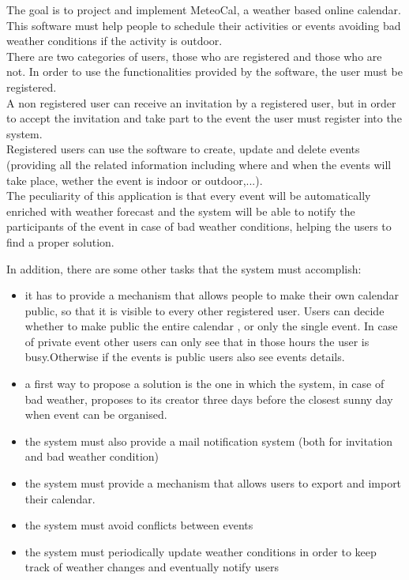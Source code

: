 \documentclass[12pt]{book}
\begin{document}
The goal is to project and implement MeteoCal, a weather based online calendar.\\This software must help people to schedule their activities or events avoiding bad weather conditions if the activity is outdoor.\\There are two categories of users, those who are registered and those who are not. In order to use the functionalities provided by the software, the user must be registered.\\A non registered user can receive an invitation by a registered user, but in order to accept the invitation and take part to the event the user must register into the system.\\
Registered users can use the software to create, update and delete events (providing all the related information including where and when the events will take place, wether the event is indoor or outdoor,...).\\
The peculiarity of this application is that every event will be automatically enriched with weather forecast and the system will be able to notify the participants of the event in case of bad weather conditions, helping the users to find a proper solution. \\ \medskip

In addition, there are some other tasks that the system must accomplish: 
\begin{itemize}
	\item it has to provide a mechanism that allows people to make their own calendar public, so that it is visible to every other registered user. Users can decide whether to make public the entire calendar , or only the single event. In case of private event other users can only see that in those hours the user is busy.Otherwise if the events is public users also see events details. 
	\item a first way to propose a solution is the one in which the system, in case of bad weather, proposes to its creator three days before the closest sunny day when event can be organised. 
	\item the system must also provide a mail notification system (both for invitation and bad weather condition) 
	\item the system must provide a mechanism that allows users to export and import their calendar. 
	\item the system must avoid conflicts between events
	\item the system must periodically update weather conditions in order to keep track of weather changes and eventually notify users
\end{itemize}
\end{document}
